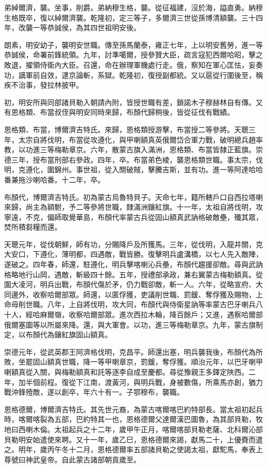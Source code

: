 \begin{pinyinscope}
弟綽爾濟，襲。坐事，削爵。弟納穆生格，襲。從征福建，沒於海，謚直勇。納穆生格既卒，復以綽爾濟襲。乾隆初，定三等子，多爾濟三世從孫博清額襲。三十四年，改襲一等恭誠侯，為其四世祖明安後。

朗素，明安幼子，襲明安世職。傳至孫馬蘭泰，雍正七年，上以明安舊勞，進一等恭誠侯，命署前鋒統領。九年，討準噶爾，授參贊大臣，疏言寇犯西爾哈昭，擊之敗退，擢領侍衛內大臣。召還，命在辦理軍機處行走。俄，察知在軍心匡怯，妄奏功，謫軍前自效，逮京論斬，系獄。乾隆初，復授副都統。又以扈從行圍後至，稱疾不治事，發拉林披甲。

初，明安所與同部諸貝勒入朝請內附，皆授世職有差，鎖諾木子穆赫林自有傳。又有恩格類、布當叔侄與明安同時來歸，布顏代歸稍後，皆從征伐有戰績。

恩格類、布當，博爾濟吉特氏。來歸，恩格類授游擊，布當授二等參將。天聰三年，太宗自將伐明，布當從攻遵化，與甲喇額真英俄爾岱合軍力戰，破明總兵趙率教，以功進三等梅勒章京。六年，散蒙古旗入滿洲，恩格類、布當皆隸正藍旗。崇德三年，授布當刑部右參政。四年，卒。布當弟色棱，襲恩格類世職。事太宗，伐明，克遵化，圍錦州。事世祖，從入關破賊，擊騰吉斯，並有功。進一等阿達哈哈番兼拖沙喇哈番。十二年，卒。

布顏代，博爾濟吉特氏。初為蒙古烏魯特貝子。天命七年，籍所轄戶口自西拉塔喇來歸，尚主為額駙，予二等參將世職，隸滿洲鑲紅旗。十一年，太祖自將伐明，攻寧遠，不克，偏師取覺華島，布顏代率蒙古兵從固山額真武訥格破敵壘，殲其眾，焚所積芻糧而還。

天聰元年，從伐朝鮮，師有功，分賜降戶及所獲馬。三年，從伐明，入龍井關，克大安口，下遵化，薄明都，四遇敵，戰皆勝。復擊明兵盧溝橋，以七人先入敵陣，遂破之。四年春，師還，駐遵化，明兵擊喀喇沁兵壘，布顏代趨援卻敵。尋與武訥格略地行山岡，遇敵，斬級四十餘。五年，授禮部承政，兼右翼蒙古梅勒額真。從圍大凌河，明兵出戰，布顏代傷於矛，仍力戰卻敵，斬一人。六年，從略宣府、大同邊外，收察哈爾部眾。師還，以匿俘獲，吏議削世職、罰鍰、奪俘獲及賜物，上命毋削世職。八年，上自將伐明，攻大同，布顏代與侍衛星訥等率蒙古巴牙喇兵八十人，經哈麻爾嶺，收察哈爾部眾。進次西拉木輪，降百餘戶；又進，遇察哈爾部俄爾塞圖等以所屬來降。還，與大軍會。以功，進三等梅勒章京。九年，蒙古旗制定，以布顏代為鑲紅旗固山額真。

崇德元年，從武英郡王阿濟格伐明，克昌平。師還出塞，明兵襲我後，布顏代為所敗，坐罷固山額真世職，降一等甲喇章京，罰鍰，奪俘獲。順治元年，以巴牙喇甲喇額真從入關，與梅勒額真和託等逐李自成至慶都。尋從豫親王多鐸定陜西。二年，加半個前程。復從下江南，渡黃河，與明兵戰，身被數傷，所乘馬亦創，猶力戰沖鋒殪敵，遂以創卒，年六十有一。子鄂穆布，襲職。

恩格德爾，博爾濟吉特氏。其先世元裔，為蒙古喀爾喀巴約特部長。當太祖初起兵時，喀爾喀裂為五部，巴約特其一也，恩格德爾父達爾漢巴圖魯，為其部貝勒，牧地曰西喇木倫。太祖起兵之十二年，歲甲午正月，喀爾喀部貝勒老薩、北科爾沁部貝勒明安始遣使來聘。又十一年，歲乙巳，恩格德爾來謁，獻馬二十，上優賚而遣之。明年，歲丙午冬十二月，恩格德爾率五部諸貝勒之使謁太祖，獻駝馬，奉表上尊號曰神武皇帝。自此蒙古諸部朝貢歲至。


\end{pinyinscope}
